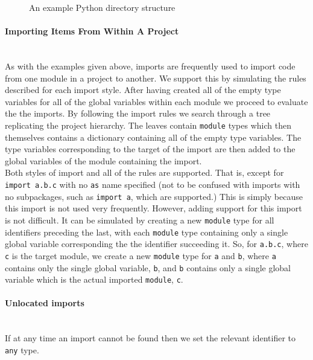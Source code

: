 \documentclass[12pt, titlepage]{article}
\begin{document}
\begin{figure}
\caption{An example Python directory structure}
\label{fig:directory}
\end{figure}


\paragraph*{Importing Items From Within A Project}\mbox{}\\
As with the examples given above, imports are frequently used to import code from one module in a project to another. We support this by simulating the rules described for each import style. After having created all of the empty type variables for all of the global variables within each module we proceed to evaluate the the imports. By following the import rules we search through a tree replicating the project hierarchy. The leaves contain \texttt{module} types which then themselves contains a dictionary containing all of the empty type variables. The type variables corresponding to the target of the import are then added to the global variables of the module containing the import. \\
\indent Both styles of import and all of the rules are supported. That is, except for \texttt{import a.b.c} with no \texttt{as} name specified (not to be confused with imports with no subpackages, such as \texttt{import a}, which are supported.) This is simply because this import is not used very frequently. However, adding support for this import is not difficult. It can be simulated by creating a new \texttt{module} type for all identifiers preceding the last, with each \texttt{module} type containing only a single global variable corresponding the the identifier succeeding it. So, for \texttt{a.b.c}, where \texttt{c} is the target module, we create a new \texttt{module} type for \texttt{a} and \texttt{b}, where \texttt{a} contains only the single global variable, \texttt{b}, and \texttt{b} contains only a single global variable which is the actual imported \texttt{module}, \texttt{c}.


\paragraph*{Unlocated imports}\mbox{} \\
If at any time an import cannot be found then we set the relevant identifier to \texttt{any} type.
\end{document}
